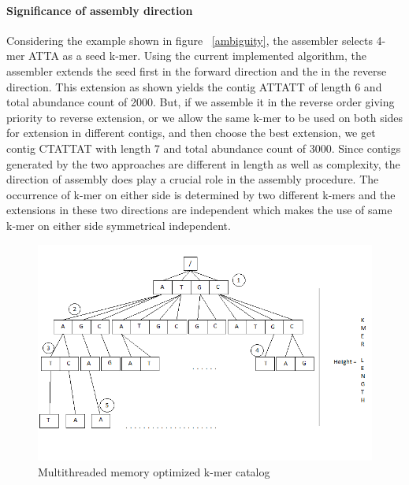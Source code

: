 \label{key}\documentclass[plainarticle, english ,zihtitle,final,hyperref,utf8]{zihpub}
\begin{document}
\paragraph{Significance of assembly direction}
Considering the example shown in figure ~\ref{ambiguity}, the assembler selects 4-mer ATTA as a seed k-mer. Using the current implemented algorithm, the assembler extends the seed first in the forward direction and the in the reverse direction. This extension as shown yields the contig ATTATT of length 6 and total abundance count of 2000. But, if we assemble it in the reverse order giving priority to reverse extension, or we allow the same k-mer to be used on both sides for extension in different contigs, and then choose the best extension, we get contig CTATTAT with length 7 and total abundance count of 3000. Since contigs generated by the two approaches are different in length as well as complexity, the direction of assembly does play a crucial role in the assembly procedure. The occurrence of k-mer on either side is determined by two different k-mers and the extensions in these two directions are independent which makes the use of same k-mer on either side symmetrical independent.
\begin{figure}[h]
\center
\includegraphics[scale=0.7]{multi-thread}
\caption{Multithreaded memory optimized k-mer catalog}
\label{trie}
\end{figure}
\end{document}
